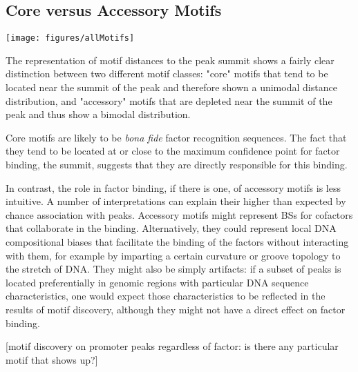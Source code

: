 \subsection{Core versus Accessory Motifs}

\begin{SCfigure}[]
    \centering
  \texttt{[image: figures/allMotifs]}
  \caption[All Motifs Found in Peak subsets]{\textbf{All Motifs Found in Peak subsets.} Sequence logos for every motif found in each non-overlapping peak subset. "Core" motifs labelled in red. The logos resulting from the motif definitions (\acp{PSSM}) which we selected as canonical and used for directed motif search are highlighted in grey. The histograms to the right of the sequence logo show the distribution of motif positions with respect to the summit of the peak.}
  \label{fig:allMotifs}
\end{SCfigure}

The representation of motif distances to the peak summit shows a fairly clear distinction between two different motif classes: "core" motifs that tend to be located near the summit of the peak and therefore shown a unimodal distance distribution, and "accessory" motifs that are depleted near the summit of the peak and thus show a bimodal distribution. 

Core motifs are likely to be \textit{bona fide} factor recognition sequences. The fact that they tend to be located at or close to the maximum confidence point for factor binding, the summit, suggests that they are directly responsible for this binding.

In contrast, the role in factor binding, if there is one, of accessory motifs is less intuitive. A number of interpretations can explain their higher than expected by chance association with peaks. Accessory motifs might represent \acp{BS} for cofactors that collaborate in the binding. Alternatively, they could represent local DNA compositional biases that facilitate the binding of the factors without interacting with them, for example by imparting a certain curvature or groove topology to the stretch of DNA. They might also be simply artifacts: if a subset of peaks is located preferentially in genomic regions with particular DNA sequence characteristics, one would expect those characteristics to be reflected in the results of motif discovery, although they might not have a direct effect on factor binding.


[motif discovery on promoter peaks regardless of factor: is there any particular motif that shows up?]



